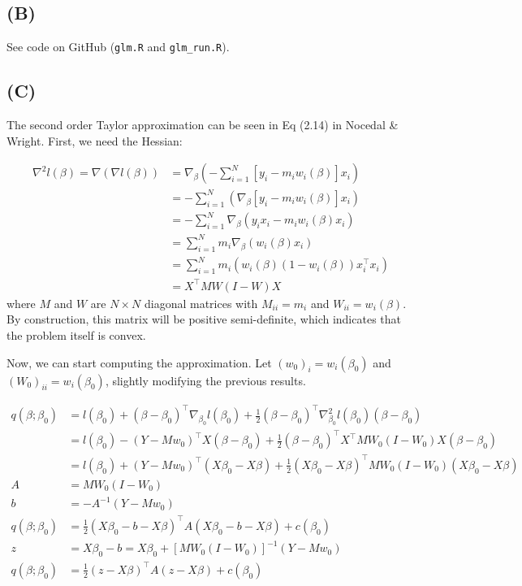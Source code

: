 \documentclass{article}
\begin{document}
\subsection{(B)}
See code on GitHub (\texttt{glm.R} and \texttt{glm\_run.R}).

\subsection{(C)}
The second order Taylor approximation can be seen in Eq (2.14) in Nocedal \& Wright. First, we need the Hessian:

\begin{align*}
\nabla^2 l(\beta)=\nabla (\nabla l(\beta))&=\nabla_\beta\left(-\sum_{i=1}^N \left[y_i- m_iw_i(\beta)\right]x_i\right)\\
&=-\sum_{i=1}^N\left(\nabla_\beta\left[y_i- m_iw_i(\beta)\right]x_i\right)\\
&=-\sum_{i=1}^N\nabla_\beta\left(y_ix_i- m_iw_i(\beta)x_i\right)\\
&=\sum_{i=1}^Nm_i\nabla_\beta\left(w_i(\beta)x_i\right)\\
&=\sum_{i=1}^Nm_i\left(w_i(\beta)(1-w_i(\beta))x_i^\top x_i\right)\\
&=X^\top M W (I-W) X
\end{align*}
where $M$ and $W$ are $N\times N$ diagonal matrices with $M_{ii}=m_i$ and $W_{ii}=w_i(\beta)$. By construction, this matrix will be positive semi-definite, which indicates that the problem itself is convex.

Now, we can start computing the approximation. Let $\left(w_0\right)_i = w_i(\beta_0)$ and $\left(W_0\right)_{ii}=w_i(\beta_0)$, slightly modifying the previous results.

\begin{align*}
q(\beta; \beta_0)&= l(\beta_0) + (\beta-\beta_0)^\top \nabla_{\beta_0} l(\beta_0) + \frac{1}{2}(\beta-\beta_0)^\top \nabla_{\beta_0}^2 l(\beta_0) (\beta-\beta_0)\\
&=l(\beta_0) -  (Y - Mw_0)^\top X(\beta-\beta_0)+ \frac{1}{2}(\beta-\beta_0)^\top X^\top M W_0 (I-W_0) X (\beta-\beta_0)\\
&=l(\beta_0) +  (Y - Mw_0)^\top (X\beta_0-X\beta)+ \frac{1}{2}(X\beta_0-X\beta)^\top  M W_0 (I-W_0) (X\beta_0-X\beta)\\
A&=M W_0 (I-W_0)\\
b&=-A^{-1}(Y - Mw_0)\\
q(\beta; \beta_0)&=\frac{1}{2}(X\beta_0-b-X\beta)^\top A (X\beta_0-b-X\beta) + c(\beta_0)\\
z&=X\beta_0-b=X\beta_0+\left[M W_0 (I-W_0)\right]^{-1}(Y - Mw_0)\\
q(\beta; \beta_0)&=\frac{1}{2}(z-X\beta)^\top A (z-X\beta) + c(\beta_0)\\
\end{align*}
\end{document}
